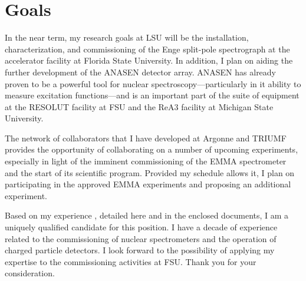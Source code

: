 \section*{Goals}
In the near term, my research goals at LSU will be the installation, characterization, and commissioning of the 
Enge split-pole spectrograph %
at the accelerator facility at Florida State University.
In addition, I plan on aiding the further development of the ANASEN detector array. 
ANASEN has already proven to be a powerful tool for nuclear spectroscopy---particularly in it ability to measure excitation functions---and is an important part of the suite of equipment at the RESOLUT facility at FSU and the ReA3 facility at Michigan State University. 

%


The  network of collaborators that I have developed at Argonne and TRIUMF provides the opportunity of collaborating on a number of upcoming experiments, especially in light of the imminent commissioning of the EMMA spectrometer and the start of its scientific program. Provided my schedule allows it, I plan on participating in the approved EMMA experiments and proposing an additional experiment.

\vspace{1.0\baselineskip}%
Based on my experience%
, detailed here and in the enclosed documents, I am a uniquely qualified candidate for this position.  I have a decade of experience related to the commissioning of nuclear spectrometers and the operation of charged particle detectors. I look forward to the possibility of applying my expertise to the commissioning activities %
at FSU. Thank you for your consideration. 
